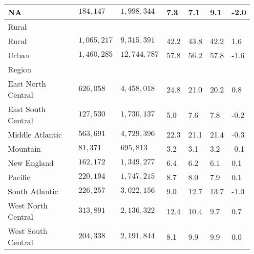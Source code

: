 \begin{longtable}{lllllll}
NA & $184,147$ & $1,998,344$ & 7.3 & 7.1 & 9.1 & -2.0 \\ 
\midrule
\multicolumn{1}{l}{Rural} \\ 
\midrule
Rural & $1,065,217$ & $9,315,391$ & 42.2 & 43.8 & 42.2 & 1.6 \\ 
Urban & $1,460,285$ & $12,744,787$ & 57.8 & 56.2 & 57.8 & -1.6 \\ 
\midrule
\multicolumn{1}{l}{Region} \\ 
\midrule
East North Central  & $626,058$ & $4,458,018$ & 24.8 & 21.0 & 20.2 & 0.8 \\ 
East South Central  & $127,530$ & $1,730,137$ & 5.0 & 7.6 & 7.8 & -0.2 \\ 
Middle Atlantic  & $563,691$ & $4,729,396$ & 22.3 & 21.1 & 21.4 & -0.3 \\ 
Mountain  & $81,371$ & $695,813$ & 3.2 & 3.1 & 3.2 & -0.1 \\ 
New England  & $162,172$ & $1,349,277$ & 6.4 & 6.2 & 6.1 & 0.1 \\ 
Pacific  & $220,194$ & $1,747,215$ & 8.7 & 8.0 & 7.9 & 0.1 \\ 
South Atlantic  & $226,257$ & $3,022,156$ & 9.0 & 12.7 & 13.7 & -1.0 \\ 
West North Central  & $313,891$ & $2,136,322$ & 12.4 & 10.4 & 9.7 & 0.7 \\ 
West South Central  & $204,338$ & $2,191,844$ & 8.1 & 9.9 & 9.9 & 0.0 \\ 
 \bottomrule
\end{longtable}

